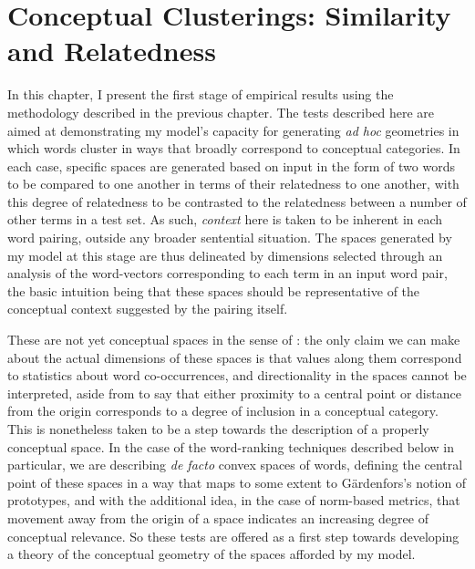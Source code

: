 \chapter{Conceptual Clusterings: Similarity and Relatedness}
In this chapter, I present the first stage of empirical results using the methodology described in the previous chapter.  The tests described here are aimed at demonstrating my model's capacity for generating \emph{ad hoc} geometries in which words cluster in ways that broadly correspond to conceptual categories.  In each case, specific spaces are generated based on input in the form of two words to be compared to one another in terms of their relatedness to one another, with this degree of relatedness to be contrasted to the relatedness between a number of other terms in a test set.  As such, \emph{context} here is taken to be inherent in each word pairing, outside any broader sentential situation.  The spaces generated by my model at this stage are thus delineated by dimensions selected through an analysis of the word-vectors corresponding to each term in an input word pair, the basic intuition being that these spaces should be representative of the conceptual context suggested by the pairing itself.

These are not yet conceptual spaces in the sense of \cite{Gardenfors2004}: the only claim we can make about the actual dimensions of these spaces is that values along them correspond to statistics about word co-occurrences, and directionality in the spaces cannot be interpreted, aside from to say that either proximity to a central point or distance from the origin corresponds to a degree of inclusion in a conceptual category.  This is nonetheless taken to be a step towards the description of a properly conceptual space.  In the case of the word-ranking techniques described below in particular, we are describing \emph{de facto} convex spaces of words, defining the central point of these spaces in a way that maps to some extent to G\"{a}rdenfors's notion of prototypes, and with the additional idea, in the case of norm-based metrics, that movement away from the origin of a space indicates an increasing degree of conceptual relevance.  So these tests are offered as a first step towards developing a theory of the conceptual geometry of the spaces afforded by my model.

